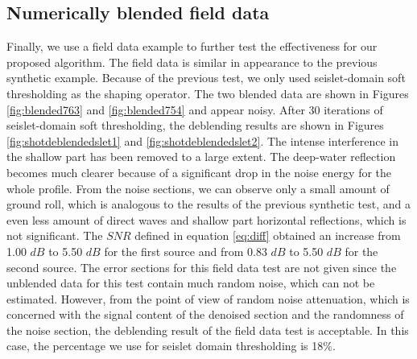 

\subsection{Numerically blended field data }

Finally, we use a field data example to further test the effectiveness for our proposed algorithm. The field data is similar in appearance to the previous synthetic example. Because of the previous test, we only used seislet-domain soft thresholding as the shaping operator.
The two blended data are shown in Figures \ref{fig:blended763} and \ref{fig:blended754} and appear noisy.
 After 30 iterations of seislet-domain soft thresholding, the deblending results are shown in Figures \ref{fig:shotdeblendedslet1} and \ref{fig:shotdeblendedslet2}.  The intense interference in the shallow part has been removed to a large extent. The deep-water reflection becomes much clearer because of a significant drop in the noise energy for the whole profile. From the noise sections, we can observe only a small amount of ground roll, which is analogous to the results of the previous synthetic test, and a even less amount of direct waves and shallow part horizontal reflections, which is not significant. The $SNR$ defined in equation \ref{eq:diff} obtained an increase from 1.00 $dB$ to 5.50 $dB$ for the first source and from 0.83 $dB$ to 5.50 $dB$ for the second source. The error sections for this field data test are not given since the unblended data for this test contain much random noise, which can not be estimated.
However, from the point of view of random noise attenuation, which is concerned with the signal content of the denoised section and the randomness of the noise section, the deblending result of the field data test is acceptable. In this case, the percentage we use for seislet domain thresholding is 18\%.

